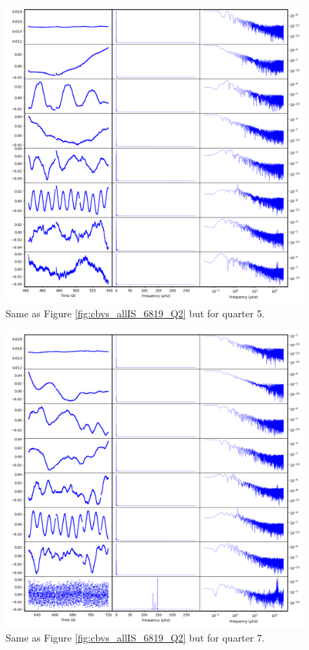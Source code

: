 \begin{figure}
    \centering
    \includegraphics[width=\linewidth]{Chapter_Appended/AppB/cbv_6819_q05.png}
    \caption{Same as Figure \ref{fig:cbvs_allIS_6819_Q2} but for quarter 5.}
    \label{fig:cbvs_allIS_6819_Q05}
\end{figure}


\begin{figure}
    \centering
    \includegraphics[width=\linewidth]{Chapter_Appended/AppB/cbv_6819_q07.png}
    \caption{Same as Figure \ref{fig:cbvs_allIS_6819_Q2} but for quarter 7.}
    \label{fig:cbvs_allIS_6819_Q07}
\end{figure}


